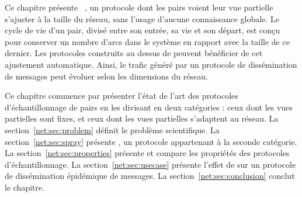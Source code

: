


Ce chapitre présente \SPRAY~\cite{nedelec2015spray}, un protocole dont les pairs
voient leur vue partielle s'ajuster à la taille du réseau, sans l'usage d'aucune
connaissance globale. Le cycle de vie d'un pair, divisé entre son entrée, sa vie
et son départ, est conçu pour conserver un nombre d'arcs dans le système en
rapport avec la taille de ce dernier. Les protocoles construits au dessus de
\SPRAY peuvent bénéficier de cet ajustement automatique. Ainsi, le trafic
généré par un protocole de dissémination de messages peut évoluer selon les
dimensions du réseau.

Ce chapitre commence par présenter l'état de l'art des protocoles
d'échantillonnage de pairs en les divisant en deux catégories : ceux dont les
vues partielles sont fixes, et ceux dont les vues partielles s'adaptent au
réseau. La section~\ref{net:sec:problem} définit le problème scientifique.  La
section~\ref{net:sec:spray} présente \SPRAY, un protocole appartenant à la
seconde catégorie. La section~\ref{net:sec:properties} présente et compare les
propriétés des protocoles d'échantillonnage. La section~\ref{net:sec:usecase}
présente l'effet de \SPRAY sur un protocole de dissémination épidémique de
messages. La section~\ref{net:sec:conclusion} conclut le chapitre.

